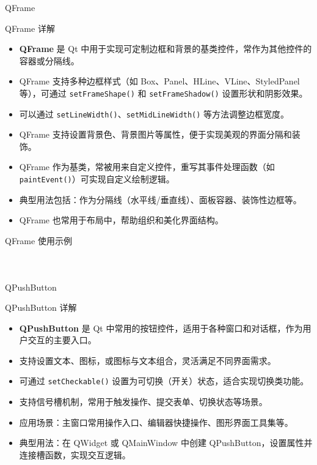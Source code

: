 \documentclass[UTF8,aspectratio=169]{beamer}
\begin{document}
\begin{frame}{QFrame}
    \begin{ytublock}{QFrame 详解}
        \begin{itemize}
            \item \textbf{QFrame} 是 Qt 中用于实现可定制边框和背景的基类控件，常作为其他控件的容器或分隔线。
            \item QFrame 支持多种边框样式（如 Box、Panel、HLine、VLine、StyledPanel 等），可通过 \texttt{setFrameShape()} 和 \texttt{setFrameShadow()} 设置形状和阴影效果。
            \item 可以通过 \texttt{setLineWidth()}、\texttt{setMidLineWidth()} 等方法调整边框宽度。
            \item QFrame 支持设置背景色、背景图片等属性，便于实现美观的界面分隔和装饰。
            \item QFrame 作为基类，常被用来自定义控件，重写其事件处理函数（如 \texttt{paintEvent()}）可实现自定义绘制逻辑。
            \item 典型用法包括：作为分隔线（水平线/垂直线）、面板容器、装饰性边框等。
            \item QFrame 也常用于布局中，帮助组织和美化界面结构。
        \end{itemize}
    \end{ytublock}
\end{frame}

\begin{frame}[fragile]{QFrame 使用示例}
    \begin{columns}
        \begin{column}{0.48\textwidth}
            \inputminted[firstline=1,lastline=17]{cpp}{code/qt_frame_example.cpp}
        \end{column}
        \begin{column}{0.48\textwidth}
            \inputminted[firstline=18,lastline=34]{cpp}{code/qt_frame_example.cpp}
        \end{column}
    \end{columns}
\end{frame}

\begin{frame}{QPushButton}
    \begin{ytublock}{QPushButton 详解}
        \begin{itemize}
            \item \textbf{QPushButton} 是 Qt 中常用的按钮控件，适用于各种窗口和对话框，作为用户交互的主要入口。
            \item 支持设置文本、图标，或图标与文本组合，灵活满足不同界面需求。
            \item 可通过 \texttt{setCheckable()} 设置为可切换（开关）状态，适合实现切换类功能。
            \item 支持信号槽机制，常用于触发操作、提交表单、切换状态等场景。
            \item 应用场景：主窗口常用操作入口、编辑器快捷操作、图形界面工具集等。
            \item 典型用法：在 QWidget 或 QMainWindow 中创建 QPushButton，设置属性并连接槽函数，实现交互逻辑。
        \end{itemize}
    \end{ytublock}
\end{frame}
\end{document}
